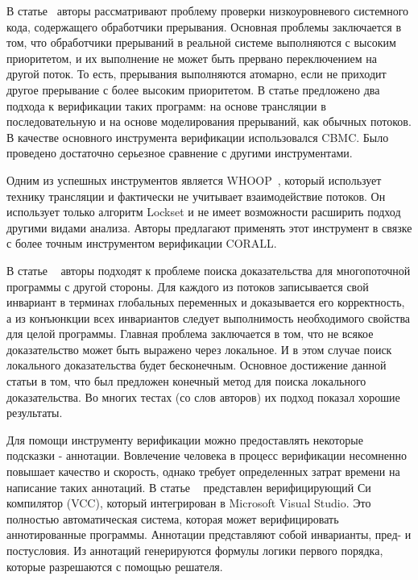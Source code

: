 В статье~\cite{Liang:2017} авторы рассматривают проблему проверки низкоуровневого системного кода, содержащего обработчики прерывания.
Основная проблемы заключается в том, что обработчики прерываний в реальной системе выполняются с высоким приоритетом, и их выполнение не может быть прервано переключением на другой поток.
То есть, прерывания выполняются атомарно, если не приходит другое прерывание с более высоким приоритетом.
В статье предложено два подхода к верификации таких программ: на основе трансляции в последовательную и на основе моделирования прерываний, как обычных потоков.
В качестве основного инструмента верификации использовался CBMC.
Было проведено достаточно серьезное сравнение с другими инструментами.

Одним из успешных инструментов является WHOOP~\cite{WHOOP}, который использует технику трансляции и фактически не учитывает взаимодействие потоков.
Он использует только алгоритм Lockset и не имеет возможности расширить подход другими видами анализа.
Авторы предлагают применять этот инструмент в связке с более точным инструментом верификации CORALL. 


В статье ~\cite{Cohen:2009} авторы подходят к проблеме поиска доказательства для многопоточной программы с другой стороны. 
Для каждого из потоков записывается свой инвариант в терминах глобальных переменных и доказывается его корректность, а из конъюнкции всех инвариантов следует выполнимость необходимого свойства для целой программы. 
Главная проблема заключается в том, что не всякое доказательство может быть выражено через локальное. И в этом случае поиск локального доказательства будет бесконечным.
Основное достижение данной статьи в том, что был предложен конечный метод для поиска локального доказательства. 
Во многих тестах (со слов авторов) их подход показал хорошие результаты. 

Для помощи инструменту верификации можно предоставлять некоторые подсказки - аннотации. Вовлечение человека в процесс верификации несомненно повышает качество и скорость, однако требует определенных затрат времени на написание таких аннотаций. 
В статье ~\cite{VCC:2009} представлен верифицирующий Си компилятор (VCC), который интегрирован в Microsoft Visual Studio. Это полностью автоматическая система, которая может верифицировать аннотированные программы. Аннотации представляют собой инварианты, пред- и постусловия. Из аннотаций генерируются формулы логики первого порядка, которые разрешаются с помощью решателя.

